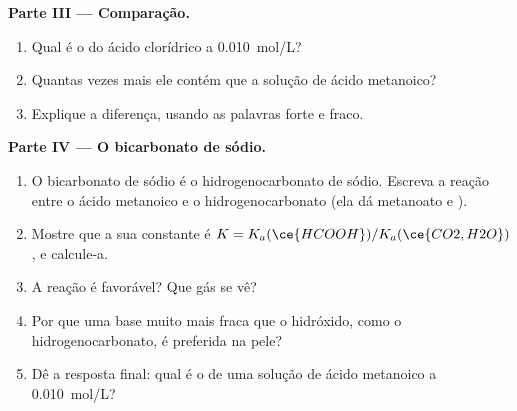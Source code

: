 \begin{problem}
\medskip
\noindent\textbf{Parte III --- Comparação.}
\begin{enumerate}[resume]
  \item Qual é o  do ácido clorídrico a \qty{0.010}{mol/L}?
  \item Quantas vezes mais  ele contém que a solução de ácido
        metanoico?
  \item Explique a diferença, usando as palavras forte e fraco.
\end{enumerate}

\medskip
\noindent\textbf{Parte IV --- O bicarbonato de sódio.}
\begin{enumerate}[resume]
  \item O bicarbonato de sódio é o hidrogenocarbonato de sódio. Escreva
        a reação entre o ácido metanoico e o  hidrogenocarbonato (ela
        dá metanoato e ).
  \item Mostre que a sua constante é $K = K_a(\ce{HCOOH}) / K_a(\ce{CO2,H2O})$,
        e calcule-a.
  \item A reação é favorável? Que gás se vê?
  \item Por que uma base muito mais fraca que o hidróxido, como o
        hidrogenocarbonato, é preferida na pele?
  \item Dê a resposta final: qual é o  de uma solução de ácido
        metanoico a \qty{0.010}{mol/L}?
\end{enumerate}
\end{problem}
